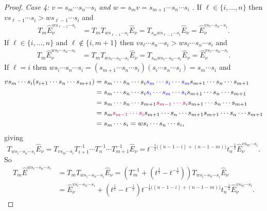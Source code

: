 \documentclass[11pt]{article}
\theoremstyle{plain}
\theoremstyle{definition}
\theoremstyle{remark}
\numberwithin{equation}{section}
\newcounter{r}
\newcounter{s}
\begin{document}
\begin{proof}
\smallskip\noindent
\emph{Case 4: $v=s_m\cdots s_n\cdots s_i$ and $w=s_m v=s_{m+1}\cdots s_n\cdots s_i$ .}
\hfil\break
If $\ell \in \{i, \ldots, n\}$ then $v s_{\ell-1} \cdots s_i > ws_{\ell-1} \cdots s_i$ and
\begin{align*}
T_m \widehat{E}^{ws_{\ell-1} \cdots  s_i}_\nu
&
= T_mT_{ws_{\ell-1} \cdots s_i}\widehat{E}_\nu
= T_{s_m ws_{\ell-1} \cdots s_i}\widehat{E}_\nu
= \widehat{E}^{vs_\ell\cdots s_n \cdots s_i}_\nu.
\end{align*}
If $\ell \in \{i,\ldots, n\}$ and $\ell\not\in \{i,m+1\}$ then $v s_\ell \cdots s_n \cdots s_i > w s_\ell\cdots s_n \cdots s_i$ and
\begin{align*}
T_m \widehat{E}^{ws_\ell \cdots s_n \cdots s_i}_\nu
&= T_m T_{ws_\ell \cdots s_n \cdots s_i}\widehat{E}_\nu
= T_{s_m ws_\ell\cdots s_n \cdots s_i}\widehat{E}_\nu
= \widehat{E}^{vs_\ell\cdots s_n \cdots s_i}_\nu.
\end{align*}
If $\ell=i$ then
$w s_i \cdots s_{n} \cdots s_i
= (s_{m+1}\cdots s_n \cdots s_i )( s_i \cdots s_n \cdots s_i ) =  s_m \cdots s_i$ and
\begin{align*}
v s_{m} \cdots s_i (s_{i+1} \cdots s_n \cdots s_{m+1}) 
&= s_ m\cdots s_n \cdots s_i {\color{blue} s_m \cdots s_i \cdots s_m } s_{m+1} \cdots s_n \cdots s_{m+1} \\
&= s_ m\cdots s_n \cdots s_i {\color{blue} s_i \cdots s_m \cdots s_i} s_{m+1} \cdots s_n \cdots s_{m+1}\\
&=  s_ m\cdots s_n \cdots s_{m+1} {\color{purple} s_{m-1} \cdots s_i } s_{m+1} \cdots s_n \cdots s_{m+1} \\
&= s_m {\color{purple} s_{m-1} \cdots s_i } s_{m+1} \cdots s_n \cdots s_{m+1}s_{m+1}\cdots s_n \cdots s_{m+1} \\
&=  s_{m} \cdots s_i
=w s_i \cdots s_n \cdots s_i,
\end{align*}
giving
$$
T_{ws_i\cdots s_n\cdots s_i}\widehat{E}_\nu
= T_{vs_m\cdots s_i}T^{-1}_{i+1}\cdots T_n^{-1}\cdots T_{m+1}^{-1}\widehat{E}_\nu
=t^{-\frac12\big((n-1-i) + (n-1-m)\big)}t_n^{-\frac12}\widehat{E}^{vs_m\cdots s_i}_\nu.
$$
So
\begin{align*}
T_m\widehat{E}^{ws_i\cdots s_n\cdots s_i}
&= T_mT_{ws_i\cdots s_n \cdots s_i}\widehat{E}_\nu
= (T_m^{-1}+(t^{\frac12}-t^{-\frac12}))T_{ws_i\cdots s_n \cdots s_i}\widehat{E}_\nu
\\
&=\widehat{E}^{vs_i\cdots s_n\cdots s_i}_\nu
+(t^{\frac12}-t^{-\frac12})t^{-\frac12\big((n-1-i) + (n-1-m)\big)}t_n^{-\frac12}\widehat{E}^{vs_m\cdots s_i}_\nu.
\end{align*}

\end{proof}
\end{document}
